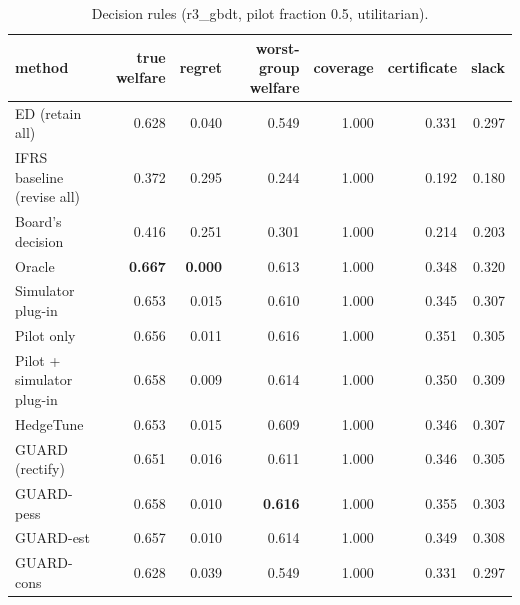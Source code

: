 \begin{table}[t]
\centering
\small
\begin{tabular}{lrrrrrr}
\toprule
method & true welfare & regret & worst-group welfare & coverage & certificate & slack \\
\midrule
ED (retain all) & 0.628 & 0.040 & 0.549 & 1.000 & 0.331 & 0.297 \\
IFRS baseline (revise all) & 0.372 & 0.295 & 0.244 & 1.000 & 0.192 & 0.180 \\
Board's decision & 0.416 & 0.251 & 0.301 & 1.000 & 0.214 & 0.203 \\
Oracle & \textbf{0.667} & \textbf{0.000} & 0.613 & 1.000 & 0.348 & 0.320 \\
Simulator plug-in & 0.653 & 0.015 & 0.610 & 1.000 & 0.345 & 0.307 \\
Pilot only & 0.656 & 0.011 & 0.616 & 1.000 & 0.351 & 0.305 \\
Pilot + simulator plug-in & 0.658 & 0.009 & 0.614 & 1.000 & 0.350 & 0.309 \\
HedgeTune & 0.653 & 0.015 & 0.609 & 1.000 & 0.346 & 0.307 \\
GUARD (rectify) & 0.651 & 0.016 & 0.611 & 1.000 & 0.346 & 0.305 \\
GUARD-pess & 0.658 & 0.010 & \textbf{0.616} & 1.000 & 0.355 & 0.303 \\
GUARD-est & 0.657 & 0.010 & 0.614 & 1.000 & 0.349 & 0.308 \\
GUARD-cons & 0.628 & 0.039 & 0.549 & 1.000 & 0.331 & 0.297 \\
\bottomrule
\end{tabular}
\caption{Decision rules (r3\_gbdt, pilot fraction 0.5, utilitarian).}
\label{tab:methods-utilitarian}
\end{table}

